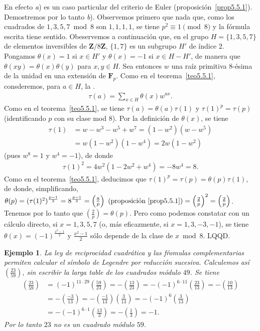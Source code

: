 \documentclass[bibtotoc,leqno,spanish]{amsbook}
\let\emph\relax %
\newcommand{\ZZ}{\mathbf{Z}}
\newcommand{\FF}{\mathbf{F}}
\newcommand{\QED}{LQQD.}
\newcommand{\leg}[2]{\left(\frac{#1}{#2}\right)}
\numberwithin{equation}{section}
\theoremstyle{note}
\theoremstyle{note}
\theoremstyle{rem}
\newtheorem*{example*}{Ejemplo}
\newtheorem*{remark*}{Observaci\'on}
\numberwithin{theorem}{section}
\numberwithin{proposition}{section}
\numberwithin{definition}{section}
\numberwithin{lemma}{section}
\numberwithin{corollary}{section}
\numberwithin{example}{section}
\numberwithin{footnote}{section}%
\begin{document}
En efecto {\itshape a}) es un caso particular del criterio de Euler (proposici\'on~\ref{prop5.5.1}).
Demostremos por lo tanto
{\itshape b}). Observemos primero que nada que, como los cuadrados de $1, 3, 5, 7\bmod 8$ son $1,1,1,1$,
se tiene $p^{2}\equiv 1\pmod 8$ y la f\'ormula escrita tiene sentido. Obeservemos a continuaci\'on
que, en el grupo $H = \{1,3,5,7\}$ de elementos inversibles de $\ZZ/8\ZZ$, $\{1,7\}$ es un subgrupo
$H'$ de \'indice $2$. Pongamos $\theta(x) = 1$ si $x\in H'$ y $\theta(x) = -1$ si $x\in H-H'$, de manera
que $\theta(xy) = \theta(x)\theta(y)$ para $x,y\in H$. Sea entonces $w$ una ra\'iz primitiva $8$-\'esima
de la unidad en una extensi\'on de $\FF_{p}$. Como en el teorema~\ref{teo5.5.1},
consderemos, para $a\in H$, la \emph{``suma de Guass''}.
\begin{gather}
\tau(a) = \sum_{x\in H}\theta(x)w^{ax}.
\end{gather}
Como en el teorema~\ref{teo5.5.1}, se tiene $\tau(a) = \theta(a)\tau(1)$ y $\tau(1)^{p}=\tau(p)$ (identificando
$p$ con su clase mod $8$). Por la definici\'on de $\theta(x)$, se tiene
\begin{align*}
\tau(1) &= w-w^{3}-w^{5}+w^{7}=(1-w^{2})(w-w^{5})\\
&= w(1-w^{2})(1-w^{4})=2w(1-w^{2})
\end{align*}
(pues $w^{8}=1$ y $w^{4}=-1$), de donde
\begin{gather*}
\tau(1)^{2}=4w^{2}(1-2w^{2}+w^{4})=-8w^{4}=8.
\end{gather*}
Como en el teorema~\ref{teo5.5.1}, deducimos que $\tau(1)^{p}=\tau(p) = \theta(p)\tau(1)$, de donde, simplificando,
$\theta(p) = (\tau(1)^{2})^{\frac{p-1}{2}}=8^{\frac{p-1}{2}}=\leg{8}{p}
\text{ (proposici\'on~\ref{prop5.5.1})}=
\leg{2}{p}^{2}=\leg{2}{p}$. Tenemos por lo tanto que $\leg{2}{p} = \theta(p)$. Pero como podemos
constatar con un c\'alculo directo, si $x=1,3,5,7$ (o, m\'as eficazmente, si $x = 1,3,-3,-1$), se
tiene $\theta(x) = (-1)^{\frac{x^{2}-1}{2}}$ y $\frac{x^{2}-1}{2}$ s\'olo depende de la clase de $x\bmod 8$. \QED

\begin{example*}
La ley de reciprocidad cuadr\'atica y las f\'romulas complementarias permiten calcular el s\'imbolo de Legendre por
reducci\'on sucesiva. Calculemos as\'i $\leg{23}{59}$, sin escribir la larga table de los cuadrados
m\'odulo $49$. Se tiene
\begin{align*}
\leg{23}{59} &= (-1)^{11\cdot 29}\leg{59}{23} = -\leg{13}{23} = -(-1)^{6\cdot 11}\leg{23}{13}=-\leg{10}{13}\\
&= -\leg{-3}{13} = -\leg{-1}{13}\leg{3}{13} =-(-1)^{6}\leg{3}{13}\\
&=-(-1)^{6\cdot 1}\leg{13}{3}=-\leg{1}{3}=-1.
\end{align*}
Por lo tanto $23$ no es un cuadrado m\'odulo $59$.
\end{example*}
\end{document}
